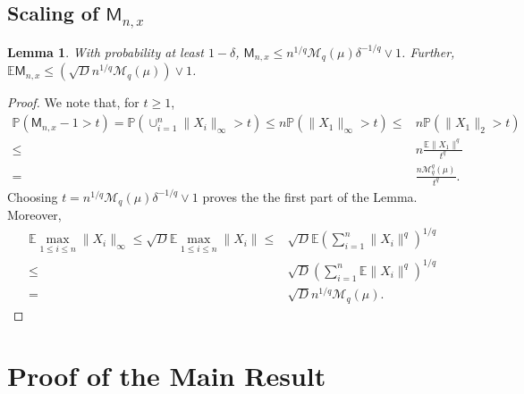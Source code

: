 \documentclass[12pts]{article}
\newtheorem{lemma}[defn]{Lemma}%
\newcommand{\prob}{\mathbb{P}}
\newcommand{\sM}{ \mathscr{M}}
\newcommand{\E}{\mathbb{E}}
\begin{document}
\subsection{Scaling of $\mathsf{M}_{n,x}$}
 \begin{lemma}\label{scaling}
    With probability at least $1-\delta$, $\mathsf{M}_{n,x} \le n^{1/q} \sM_q(\mu) \delta^{-1/q} \vee 1$. Further, $\E \mathsf{M}_{n,x} \le \left(\sqrt{D} n^{1/q} \sM_q(\mu)\right) \vee 1$.
\end{lemma}
\begin{proof}
    We note that, for $t \ge 1$,
    \begin{align*}
         \prob(\mathsf{M}_{n,x} -1 > t) 
        =  \prob\left(\cup_{i=1}^n \|X_i\|_\infty > t\right)
        \le  n \prob\left(\|X_1\|_\infty > t\right)
        \le & n \prob\left(\|X_1\|_2 > t\right)\\
        \le & n \frac{\E \|X_1\|^q}{t^q}\\
        = & \frac{n \sM_q^q(\mu)}{t^q}.
    \end{align*}
    Choosing $t = n^{1/q} \sM_q(\mu) \delta^{-1/q} \vee 1$ proves the the first part of the Lemma. Moreover,
    \begin{align*}
        \E \max_{1 \le i \le n} \|X_i\|_\infty \le  \sqrt{D} \E \max_{1 \le i \le n} \|X_i\| 
        \le & \sqrt{D} \E \left(\sum_{i=1}^n \|X_i\|^q \right)^{1/q}\\
        \le & \sqrt{D} \left(\sum_{i=1}^n \E  \|X_i\|^q \right)^{1/q} \\
        = & \sqrt{D} n^{1/q} \sM_q(\mu).
    \end{align*}
\end{proof}

\section{Proof of the Main Result}
\end{document}
